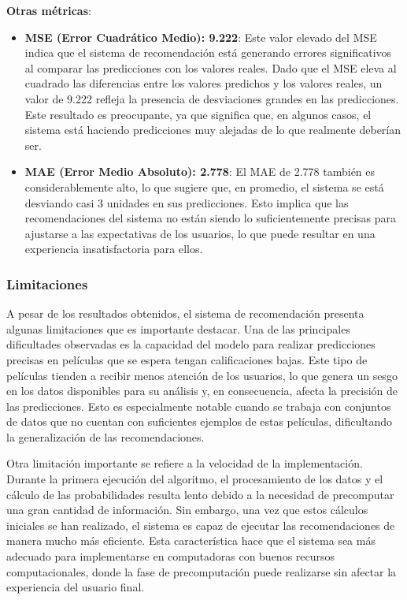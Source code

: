 \documentclass[runningheads,a4paper]{llncs}
\begin{document}
\textbf{Otras métricas}:
\begin{itemize}
    \item \textbf{MSE (Error Cuadrático Medio): 9.222}: Este valor elevado del MSE indica que el sistema de recomendación está generando errores significativos al comparar las predicciones con los valores reales. Dado que el MSE eleva al cuadrado las diferencias entre los valores predichos y los valores reales, un valor de 9.222 refleja la presencia de desviaciones grandes en las predicciones. Este resultado es preocupante, ya que significa que, en algunos casos, el sistema está haciendo predicciones muy alejadas de lo que realmente deberían ser.
    \item \textbf{MAE (Error Medio Absoluto): 2.778}: El MAE de 2.778 también es considerablemente alto, lo que sugiere que, en promedio, el sistema se está desviando casi 3 unidades en sus predicciones. Esto implica que las recomendaciones del sistema no están siendo lo suficientemente precisas para ajustarse a las expectativas de los usuarios, lo que puede resultar en una experiencia insatisfactoria para ellos.
\end{itemize}

\subsubsection{Limitaciones}

A pesar de los resultados obtenidos, el sistema de recomendación presenta algunas limitaciones que es importante destacar. Una de las principales dificultades observadas es la capacidad del modelo para realizar predicciones precisas en películas que se espera tengan calificaciones bajas. Este tipo de películas tienden a recibir menos atención de los usuarios, lo que genera un sesgo en los datos disponibles para su análisis y, en consecuencia, afecta la precisión de las predicciones. Esto es especialmente notable cuando se trabaja con conjuntos de datos que no cuentan con suficientes ejemplos de estas películas, dificultando la generalización de las recomendaciones.

Otra limitación importante se refiere a la velocidad de la implementación. Durante la primera ejecución del algoritmo, el procesamiento de los datos y el cálculo de las probabilidades resulta lento debido a la necesidad de precomputar una gran cantidad de información. Sin embargo, una vez que estos cálculos iniciales se han realizado, el sistema es capaz de ejecutar las recomendaciones de manera mucho más eficiente. Esta característica hace que el sistema sea más adecuado para implementarse en computadoras con buenos recursos computacionales, donde la fase de precomputación puede realizarse sin afectar la experiencia del usuario final.
\end{document}

